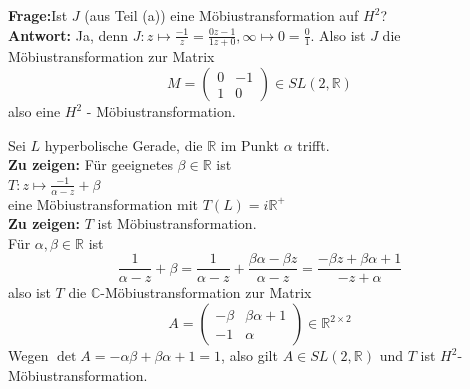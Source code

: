 \begin{problem}[2b]
  \textbf{Frage:}Ist \( J \) (aus Teil (a)) eine Möbiustransformation auf \( H^2 \)? \\
  \textbf{Antwort:} Ja, denn \( J: z \mapsto \frac{-1}{z} = \frac{0z - 1}{1z + 0}, \infty \mapsto 0 = \frac{0}{1} \). Also ist \( J \) die Möbiustransformation zur Matrix
  \begin{equation*}
    M = \begin{pmatrix}
      0 & -1 \\
      1 & 0 
    \end{pmatrix} \in SL(2,\mathbb{R})
  \end{equation*}
  also eine \( H^2 \) - Möbiustransformation.
\end{problem}

\begin{problem}[3a]
  Sei \( L \) hyperbolische Gerade, die \( \mathbb{R} \) im Punkt \( \alpha \) trifft. \\
  \textbf{Zu zeigen:} Für geeignetes \( \beta \in \mathbb{R} \) ist \\
  \( T: z \mapsto \frac{-1}{\alpha - z} + \beta \) \\
  eine Möbiustransformation mit \( T(L) = i \mathbb{R}^{+} \) \\
  \textbf{Zu zeigen:} \( T \) ist Möbiustransformation. \\
  Für \( \alpha, \beta \in \mathbb{R} \) ist
  \begin{equation*}
    \frac{1}{\alpha -z} + \beta = \frac{1}{\alpha-z} + \frac{\beta \alpha - \beta z}{\alpha - z} = \frac{-\beta z + \beta \alpha + 1}{-z +\alpha}
  \end{equation*} 
  also ist \( T \) die \( \mathbb{C} \)-Möbiustransformation zur Matrix
  \begin{equation*}
    A = \begin{pmatrix}
      - \beta & \beta \alpha + 1 \\
      - 1 & \alpha 
    \end{pmatrix} \in \mathbb{R}^{2 \times 2}
  \end{equation*}
  Wegen \( \det A = - \alpha \beta + \beta \alpha + 1 = 1 \), also gilt \( A \in SL(2, \mathbb{R}) \) und \( T \) ist \( H^2 \)-Möbiustransformation.
\end{problem}
